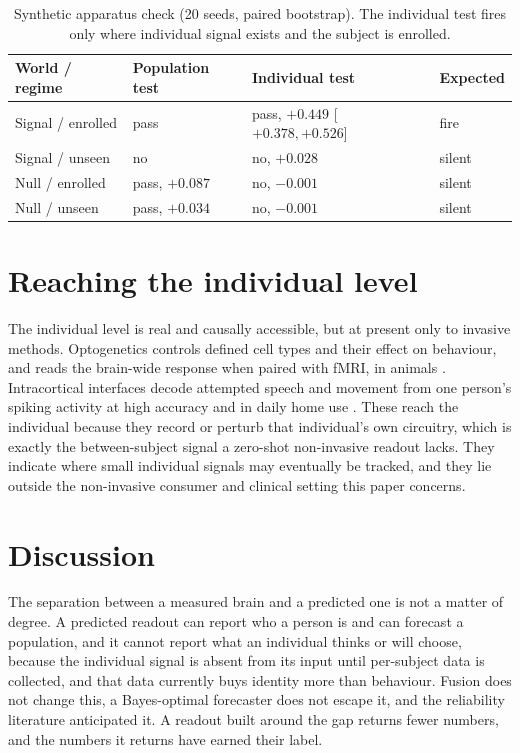 \documentclass[11pt]{article}
\begin{document}
\begin{table}[t]
\centering\small
\caption{Synthetic apparatus check (20 seeds, paired bootstrap). The individual test fires only where
individual signal exists and the subject is enrolled.}
\label{tab:gates}
\begin{tabular}{@{}llll@{}}
\toprule
World / regime & Population test & Individual test & Expected \\
\midrule
Signal / enrolled & pass & pass, $+0.449$ [$+0.378,+0.526$] & fire \\
Signal / unseen & no & no, $+0.028$ & silent \\
Null / enrolled & pass, $+0.087$ & no, $-0.001$ & silent \\
Null / unseen & pass, $+0.034$ & no, $-0.001$ & silent \\
\bottomrule
\end{tabular}
\end{table}

\section*{Reaching the individual level}
The individual level is real and causally accessible, but at present only to invasive methods. Optogenetics
controls defined cell types and their effect on behaviour, and reads the brain-wide response when paired with
fMRI, in animals \citep{zhao2011,bernalcasas2017}. Intracortical interfaces decode attempted speech and movement
from one person's spiking activity at high accuracy and in daily home use \citep{willett2023,card2025,silva2024}.
These reach the individual because they record or perturb that individual's own circuitry, which is exactly the
between-subject signal a zero-shot non-invasive readout lacks. They indicate where small individual signals may
eventually be tracked, and they lie outside the non-invasive consumer and clinical setting this paper concerns.

\section*{Discussion}
The separation between a measured brain and a predicted one is not a matter of degree. A predicted readout can
report who a person is and can forecast a population, and it cannot report what an individual thinks or will
choose, because the individual signal is absent from its input until per-subject data is collected, and that
data currently buys identity more than behaviour. Fusion does not change this, a Bayes-optimal forecaster does
not escape it, and the reliability literature anticipated it. A readout built around the gap returns fewer
numbers, and the numbers it returns have earned their label.
\end{document}
